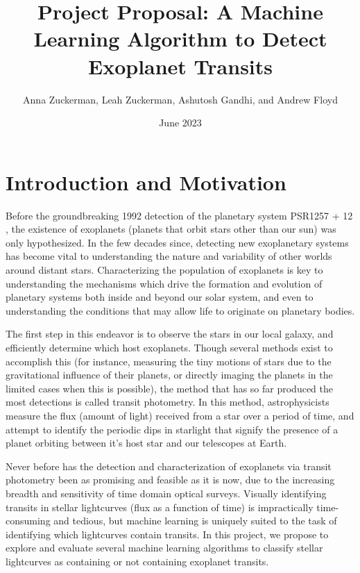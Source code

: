 \documentclass{article}
\title{Project Proposal: A Machine Learning Algorithm to Detect Exoplanet Transits}
\author{Anna Zuckerman, Leah Zuckerman, Ashutosh Gandhi, and Andrew Floyd}
\date{June 2023}
\begin{document}
\maketitle

\section{Introduction and Motivation}



Before the groundbreaking 1992 detection of the planetary system PSR1257 + 12 \citep{Wolszczan1992}, the existence of exoplanets (planets that orbit stars other than our sun) was only hypothesized. In the few decades since, detecting new exoplanetary systems has become vital to understanding the nature and variability of other worlds around distant stars. Characterizing the population of exoplanets is key to understanding the mechanisms which drive the formation and evolution of planetary systems both inside and beyond our solar system, and even to understanding the conditions that may allow life to originate on planetary bodies.

The first step in this endeavor is to observe the stars in our local galaxy, and efficiently determine which host exoplanets. Though several methods exist to accomplish this (for instance, measuring the tiny motions of stars due to the gravitational influence of their planets, or directly imaging the planets in the limited cases when this is possible), the method that has so far produced the most detections is called transit photometry. In this method, astrophysicists measure the flux (amount of light) received from a star over a period of time, and attempt to identify the periodic dips in starlight that signify the presence of a planet orbiting between it's host star and our telescopes at Earth.

Never before has the detection and characterization of exoplanets via transit photometry been as promising and feasible as it is now, due to the increasing breadth and sensitivity of time domain optical surveys. Visually identifying transits in stellar lightcurves (flux as a function of time) is impractically time-consuming and tedious, but machine learning is uniquely suited to the task of identifying which lightcurves contain transits. 
In this project, we propose to explore and evaluate several machine learning algorithms to classify stellar lightcurves as containing or not containing exoplanet transits. 
\end{document}
